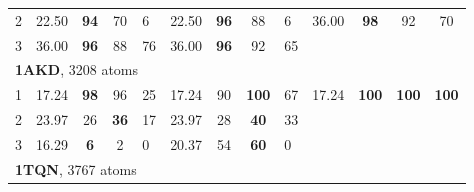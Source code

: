 \begin{tabular}{ccccp{0.5cm}cccp{0.5cm}cccc}
 2 & 22.50    & {\bf 94}  & 70  & 6   &   22.50    & {\bf 96}  & 88  & 6   &   36.00    & {\bf 98}  & 92  & 70 \\ 
 3 & 36.00    & {\bf 96}  & 88  & 76   &   36.00    & {\bf 96}  & 92  & 65   &        & {\bf  }  & {\bf  }  & {\bf  } \\ 
\midrule
\multicolumn{5}{l}{{\bf 1AKD}, 3208 atoms} \\
 1 & 17.24    & {\bf 98}  & 96  & 25   &   17.24    & 90  & {\bf 100}  & 67   &   17.24    & {\bf 100}  & {\bf 100}  & {\bf 100} \\ 
 2 & 23.97    & 26  & {\bf 36}  & 17   &   23.97    & 28  & {\bf 40}  & 33   &        & {\bf  }  & {\bf  }  & {\bf  } \\ 
 3 & 16.29    & {\bf 6}  & 2  & 0   &   20.37    & 54  & {\bf 60}  & 0   &        & {\bf  }  & {\bf  }  & {\bf  } \\ 
\midrule
\multicolumn{5}{l}{{\bf 1TQN}, 3767 atoms } \\

\end{tabular}
